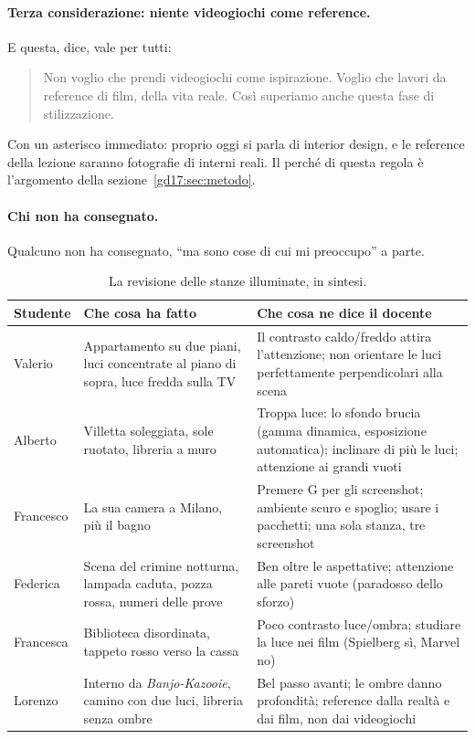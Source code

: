 \paragraph{Terza considerazione: niente videogiochi come reference.} E questa, dice,
vale per tutti:
\begin{quote}
Non voglio che prendi videogiochi come ispirazione. Voglio che lavori da reference di
film, della vita reale. Così superiamo anche questa fase di stilizzazione.
\end{quote}
Con un asterisco immediato: proprio oggi si parla di interior design, e le reference
della lezione saranno fotografie di interni reali. Il perché di questa regola è
l'argomento della sezione~\ref{gd17:sec:metodo}.

\paragraph{Chi non ha consegnato.} Qualcuno non ha consegnato, ``ma sono cose di cui mi
preoccupo'' a parte.

\begin{table}[ht]
\centering
\small
\begin{tabular}{@{}p{}p{}p{}@{}}
\toprule
\textbf{Studente} & \textbf{Che cosa ha fatto} & \textbf{Che cosa ne dice il docente} \\
\midrule
Valerio & Appartamento su due piani, luci concentrate al piano di sopra, luce
  fredda sulla TV &
  Il contrasto caldo/freddo attira l'attenzione; non orientare le luci
  perfettamente perpendicolari alla scena \\
Alberto & Villetta soleggiata, sole ruotato, libreria a muro &
  Troppa luce: lo sfondo brucia (gamma dinamica, esposizione automatica);
  inclinare di più le luci; attenzione ai grandi vuoti \\
Francesco & La sua camera a Milano, più il bagno &
  Premere G per gli screenshot; ambiente scuro e spoglio; usare i pacchetti;
  una sola stanza, tre screenshot \\
Federica & Scena del crimine notturna, lampada caduta, pozza rossa, numeri delle
  prove &
  Ben oltre le aspettative; attenzione alle pareti vuote (paradosso dello
  sforzo) \\
Francesca & Biblioteca disordinata, tappeto rosso verso la cassa &
  Poco contrasto luce/ombra; studiare la luce nei film (Spielberg sì, Marvel no) \\
Lorenzo & Interno da \emph{Banjo-Kazooie}, camino con due luci, libreria senza
  ombre &
  Bel passo avanti; le ombre danno profondità; reference dalla realtà e dai
  film, non dai videogiochi \\
\bottomrule
\end{tabular}
\caption{La revisione delle stanze illuminate, in sintesi.}
\label{gd17:tab:revisione}
\end{table}

